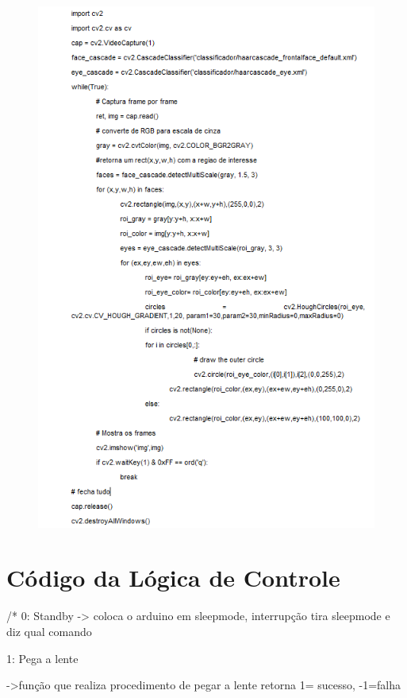 \begin{apendicesenv}
\begin{figure}[H]
		\centering
			\includegraphics[scale=1.0]{figuras/img31.png}
		\label{img31}
\end{figure}




\chapter{Código da Lógica de Controle}

/*
    0: Standby -> coloca o arduino em sleepmode, interrupção tira sleepmode e diz qual comando
   
  1: Pega a lente
 
             ->função que realiza procedimento de pegar a lente retorna 1= sucesso, -1=falha


\end{apendicesenv}

